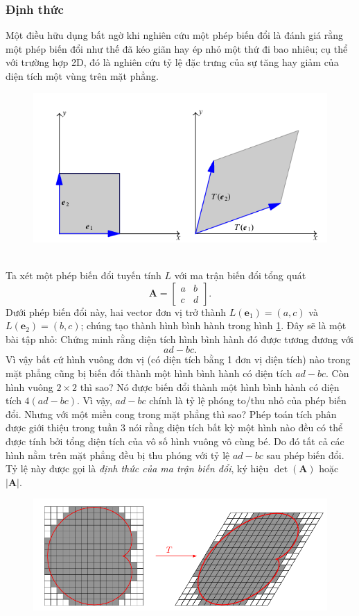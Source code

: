 \subsubsection*{Định thức}
Một điều hữu dụng bất ngờ khi nghiên cứu một phép biến đổi là đánh giá rằng một phép biến đổi như thế đã kéo giãn hay ép nhỏ một thứ đi bao nhiêu;
cụ thể với trường hợp 2D, đó là nghiên cứu tỷ lệ đặc trưng của sự tăng hay giảm của diện tích một vùng trên mặt phẳng. 
\begin{figure}[H]
    \centering
    \includegraphics[width=0.6\linewidth]{Tuan2/Figures/det1.png}\
    \caption{}
    \label{DT1}
\end{figure}
Ta xét một phép biến đổi tuyến tính \(L\) với ma trận biến đổi tổng quát
\[\mathbf{A}=\begin{bmatrix}
    a&b\\c&d
\end{bmatrix}.\] Dưới phép biến đổi này, hai vector đơn vị trở thành \(L(\mathbf{e}_1)=(a,c)\) và \(L(\mathbf{e}_2)=(b,c)\); chúng tạo thành hình bình hành trong hình \ref{DT1}. Đây sẽ là một bài tập nhỏ: Chứng minh rằng diện tích hình bình hành đó được tương đương với 
\[ad-bc.\] Vì vậy bất cứ hình vuông đơn vị (có diện tích bằng 1 đơn vị diện tích) nào trong mặt phẳng cũng bị biến đổi thành một hình bình hành có diện tích \(ad-bc\). Còn hình vuông \(2\times 2\) thì sao? Nó được biến đổi thành một hình bình hành có diện tích \(4(ad-bc)\).
Vì vậy, \(ad-bc\) chính là tỷ lệ phóng to/thu nhỏ của phép biến đổi. Nhưng với một miền cong trong mặt phẳng thì sao? Phép toán tích phân được giới thiệu trong tuần 3 nói rằng diện tích bất kỳ một hình nào đều có thể được tính bởi tổng diện tích của vô số hình vuông vô cùng bé. Do đó tất cả các hình nằm trên mặt phẳng
đều bị thu phóng với tỷ lệ \(ad-bc\) sau phép biến đổi. Tỷ lệ này được gọi là \emph{định thức của ma trận biến đổi}, ký hiệu \(\det(\mathbf{A})\) hoặc \(\lvert \mathbf{A}\rvert\).
\begin{figure}[H]
    \centering
    \includegraphics[width=0.6\linewidth]{Tuan2/Figures/det2.png}
\end{figure}

